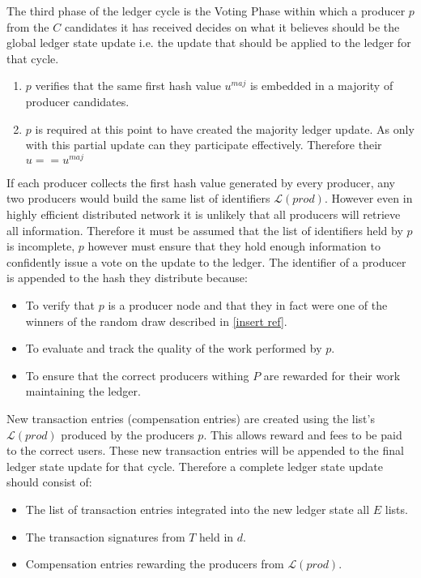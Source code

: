 The third phase of the ledger cycle is the Voting Phase within which a producer $p$ from the $C$ candidates it has received decides on what it believes should be the global ledger state update i.e. the update that should be applied to the ledger for that cycle.



\begin{enumerate}
\item $p$ verifies that the same first hash value $u^{maj}$ is embedded in a majority of producer candidates.
\item $p$ is required at this point to have created the majority ledger update. As only with this partial update can they participate effectively. Therefore their $u == u^{maj}$

\end{enumerate}

If each producer collects the first hash value generated by every producer, any two producers would build the same list of identifiers $\mathcal{L}(prod)$. However even in highly efficient distributed network it is unlikely that all producers will retrieve all information. Therefore it must be assumed that the list of identifiers held by $p$ is incomplete, $p$ however must ensure that they hold enough information to confidently issue a vote on the update to the ledger. The identifier of a producer is appended to the hash they distribute because:

\begin{itemize}
\item To verify that $p$ is a producer node and that they in fact were one of the winners of the random draw described in \ref{insert ref}.
\item To evaluate and track the quality of the work performed by $p$.
\item To ensure that the correct producers withing $P$ are rewarded for their work maintaining the ledger. \\

\end{itemize}

New transaction entries (compensation entries) are created using the list's  $\mathcal{L}(prod)$ produced by the producers $p$. This allows reward and fees to be paid to the correct users. These new transaction entries will be appended to the final ledger state update for that cycle. Therefore a complete ledger state update should consist of:

\begin{itemize}
\item The list of transaction entries integrated into the new ledger state all $E$ lists.
\item The transaction signatures from $T$ held in $d$.
\item Compensation entries rewarding the producers from $\mathcal{L}(prod)$.

\end{itemize}

